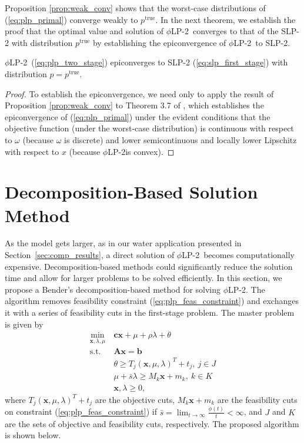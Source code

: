 \documentclass[ijoc,letterpaper]{informs3} %
\newcommand{\x}{\mathbf{x}}
\renewcommand{\c}{\mathbf{c}}
\newcommand{\A}{\mathbf{A}}
\renewcommand{\b}{\mathbf{b}}
\newcommand{\ptrue}{p^{\text{true}}}
\newcommand{\st}{\mbox{s.t.}}
\newcommand{\plp}{$\phi$LP-2}
\begin{document}
Proposition \ref{prop:weak_conv} shows that the worst-case distributions of (\ref{eq:plp_primal}) converge weakly to $\ptrue$.
In the next theorem, we establish the proof that the optimal value and solution of \plp\ converges to that of the SLP-2 with distribution $\ptrue$ by establishing the epiconvergence of \plp\ to SLP-2.
\begin{theorem}
	\plp\ (\ref{eq:plp_two_stage}) epiconverges to SLP-2 (\ref{eq:slp_first_stage}) with distribution $p = \ptrue$.
\end{theorem}

\begin{proof}
	To establish the epiconvergence, we need only to apply the result of Proposition \ref{prop:weak_conv} to Theorem 3.7 of \cite{dupacova1988asymptotic}, which establishes the epiconvergence of (\ref{eq:plp_primal}) under the evident conditions that the objective function (under the worst-case distribution) is continuous with respect to $\omega$ (because $\omega$ is discrete) and lower semicontinuous and locally lower Lipschitz with respect to $x$ (because \plp is convex).
\end{proof}

\section{Decomposition-Based Solution Method}
\label{sec:soln_algorithm}

As the model gets larger, as in our water application presented in Section~\ref{sec:comp_results}, a direct solution of \plp\ becomes computationally expensive. 
Decomposition-based methods could significantly reduce the solution time and allow for larger problems to be solved efficiently. In this section, we propose a Bender's decomposition-based method for solving \plp.
The algorithm removes feasibility constraint (\ref{eq:plp_feas_constraint})  and exchanges it with a series of feasibility cuts in the first-stage problem.
The master problem is given by
\begin{align}
	\min_{\x,\lambda,\mu} \ & \c\x + \mu + \rho \lambda + \theta \label{eq:master_problem}\\
	\st \ & \A\x = \b \nonumber \\
	& \theta \geq T_j (\x,\mu,\lambda)^T + t_j, \ j \in J \nonumber \\
	& \mu + \bar{s}\lambda \geq M_k \x + m_k, \ k \in K \nonumber \\
	& \x,\lambda \geq 0, \nonumber
\end{align}
where $T_j (\x,\mu,\lambda)^T + t_j$ are the objective cuts, $M_k \x + m_k$ are the feasibility cuts on constraint (\ref{eq:plp_feas_constraint}) if $\bar{s} = \lim_{t \rightarrow \infty} \frac{\phi(t)}{t} < \infty$, and $J$ and $K$ are the sets of objective and feasibility cuts, respectively.
The proposed algorithm is shown below.
\end{document}
